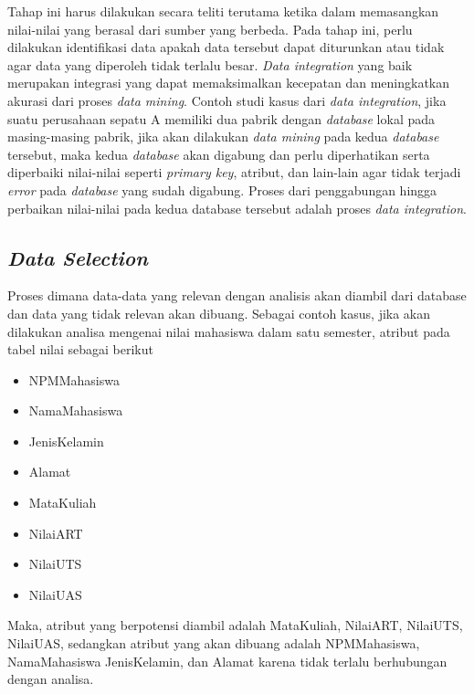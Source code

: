 Tahap ini harus dilakukan secara teliti terutama ketika dalam memasangkan nilai-nilai yang berasal dari sumber yang berbeda. Pada tahap ini, perlu dilakukan identifikasi data apakah data tersebut dapat diturunkan atau tidak agar data yang diperoleh tidak terlalu besar. \textsl{Data integration} yang baik merupakan integrasi yang dapat memaksimalkan kecepatan dan meningkatkan akurasi dari proses \textsl{data mining}. Contoh studi kasus dari \textsl{data integration}, jika suatu perusahaan sepatu A memiliki dua pabrik dengan \textsl{database} lokal pada masing-masing pabrik, jika akan dilakukan \textsl{data mining} pada kedua \textsl{database }tersebut, maka kedua \textsl{database} akan digabung dan perlu diperhatikan serta diperbaiki nilai-nilai seperti \textsl{primary key}, atribut, dan lain-lain agar tidak terjadi \textsl{error} pada \textsl{database} yang sudah digabung. Proses dari penggabungan hingga perbaikan nilai-nilai pada kedua database tersebut adalah proses \textsl{data integration}.

\subsection{\textsl{Data Selection}}
Proses dimana data-data yang relevan dengan analisis akan diambil dari database dan data yang tidak relevan akan dibuang. Sebagai contoh kasus, jika akan dilakukan analisa mengenai nilai mahasiswa dalam satu semester, atribut pada tabel nilai sebagai berikut
	\begin{itemize}
		\item NPMMahasiswa
		\item NamaMahasiswa
		\item JenisKelamin
		\item Alamat
		\item MataKuliah
		\item NilaiART
		\item NilaiUTS
		\item NilaiUAS
	\end{itemize}
Maka, atribut yang berpotensi diambil adalah MataKuliah, NilaiART, NilaiUTS, NilaiUAS, sedangkan atribut yang akan dibuang adalah NPMMahasiswa, NamaMahasiswa JenisKelamin, dan Alamat karena tidak terlalu berhubungan dengan analisa.

